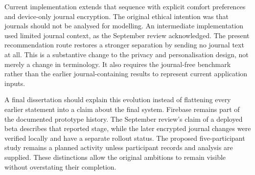 Current implementation extends that sequence with explicit comfort preferences and device-only journal encryption. The original ethical intention was that journals should not be analysed for modelling. An intermediate implementation used limited journal context, as the September review acknowledged. The present recommendation route restores a stronger separation by sending no journal text at all. This is a substantive change to the privacy and personalisation design, not merely a change in terminology. It also requires the journal-free benchmark rather than the earlier journal-containing results to represent current application inputs.

A final dissertation should explain this evolution instead of flattening every earlier statement into a claim about the final system. Firebase remains part of the documented prototype history. The September review's claim of a deployed beta describes that reported stage, while the later encrypted journal changes were verified locally and have a separate rollout status. The proposed five-participant study remains a planned activity unless participant records and analysis are supplied. These distinctions allow the original ambitions to remain visible without overstating their completion.
